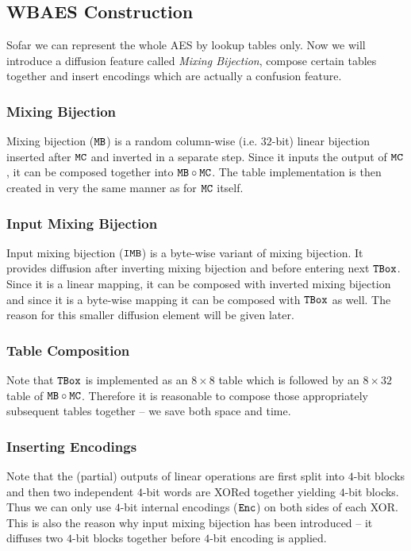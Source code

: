 \subsection{WBAES Construction}

Sofar we can represent the whole AES by lookup tables only. Now we will introduce a diffusion feature called {\em Mixing Bijection}, compose certain tables together and insert encodings which are actually a confusion feature.

\subsubsection{Mixing Bijection}
	
	Mixing bijection ($\texttt{MB}$) is a random column-wise (i.e. $32$-bit) linear bijection inserted after $\texttt{MC}$ and inverted in a separate step. Since it inputs the output of $\texttt{MC}$, it can be composed together into $\texttt{MB}\circ\texttt{MC}$. The table implementation is then created in very the same manner as for $\texttt{MC}$ itself.
	

\subsubsection{Input Mixing Bijection}
	
	Input mixing bijection ($\texttt{IMB}$) is a byte-wise variant of mixing bijection. It provides diffusion after inverting mixing bijection and before entering next $\texttt{TBox}$. Since it is a linear mapping, it can be composed with inverted mixing bijection and since it is a byte-wise mapping it can be composed with $\texttt{TBox}$ as well. The reason for this smaller diffusion element will be given later.

\subsubsection{Table Composition}
	
	Note that $\texttt{TBox}$ is implemented as an $8\times 8$ table which is followed by an $8\times 32$ table of $\texttt{MB}\circ\texttt{MC}$. Therefore it is reasonable to compose those appropriately subsequent tables together -- we save both space and time.

\subsubsection{Inserting Encodings}
	
	Note that the (partial) outputs of linear operations are first split into $4$-bit blocks and then two independent $4$-bit words are XORed together yielding $4$-bit blocks. Thus we can only use $4$-bit internal encodings ($\texttt{Enc}$) on both sides of each XOR. This is also the reason why input mixing bijection has been introduced -- it diffuses two $4$-bit blocks together before $4$-bit encoding is applied.
	
